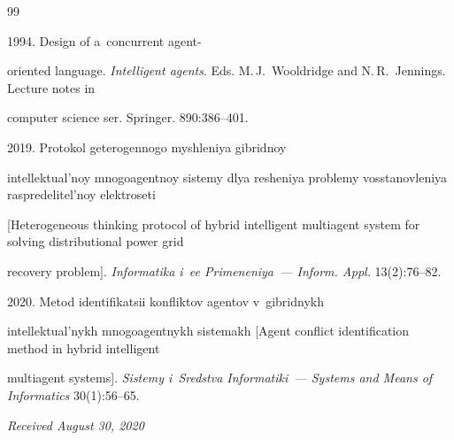 {{\begin{thebibliography}{99}


    1994. Design of a~concurrent agent-


oriented language. \textit{Intelligent agents}. Eds. M.\,J.~Wooldridge and N.\,R.~Jennings. Lecture notes in 


computer science ser. Springer. 890:386--401.




    2019. Protokol geterogennogo myshleniya gibridnoy 


intellektual'noy mnogoagentnoy sistemy dlya resheniya problemy vosstanovleniya raspredelitel'noy elektroseti 


[Heterogeneous thinking protocol of hybrid intelligent multiagent system for solving distributional power grid 


recovery problem]. \textit{Informatika i~ee Primeneniya~--- Inform. Appl.} 13(2):76--82.




    2020. Metod identifikatsii konfliktov agentov v~gibridnykh 


intellektual'nykh mnogoagentnykh sistemakh [Agent conflict identification method in hybrid intelligent 


multiagent systems]. \textit{Sistemy i~Sredstva Informatiki~--- Systems and Means of Informatics} 30(1):56--65.


   


   \end{thebibliography}


   } }


   




   


   \hfill{\small\textit{Received August 30, 2020}} 


   




   


   


   \Contr


